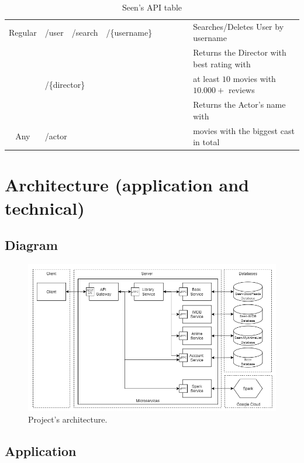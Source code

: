 \documentclass[oneside]{article}
\newcommand{\xmark}{\ding{53}} %
\begin{document}
\begin{table}[H]
\begin{adjustbox}{width=1.6\textwidth}
\begin{tabular}{ c|l l l l|c|c|c|c|l }
    \multirow{-2}{*}{Regular} 
    & /user & /search & \multicolumn{2}{l|}{/\{username\}} &
    \xmark & & & \xmark &
    Searches/Deletes User by username
    \\ \hhline{-|----|-|-|-|-|~}
    & \multicolumn{4}{l|}{} &
     & & & &
    Returns the Director with best rating with \\
    & \multicolumn{4}{l|}{\multirow{-2}{*}{/\{director\}}} &
    \multirow{-2}{*}{\xmark}
     & & & &
    at least $10$ movies with $10.000+$ reviews
    \\ 
    & \multicolumn{4}{l|}{} &
     & & & &
    Returns the Actor's name with \\
    \multirow{-4}{*}{Any} 
    & \multicolumn{4}{l|}{\multirow{-2}{*}{/actor}} &
    \multirow{-2}{*}{\xmark} & & & &
    movies with the biggest cast in total
  \end{tabular}
  \end{adjustbox}
  \caption{Seen's API table}
\end{table}

\section{Architecture (application and technical)}
\label{sec:architecture}
  \subsection{Diagram}
  \begin{figure}[H]
    \centering
    \includegraphics[width=\textwidth]{ CloudNativeAppArchitecture.png }
    \caption{Project's architecture.}
    \label{img:architecture}
  \end{figure}

  \subsection{Application}
\end{document}
